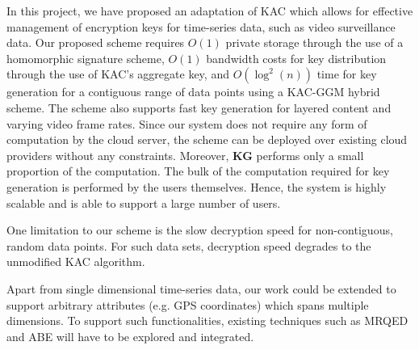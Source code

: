\documentclass[hyp,a4paper,12pt,openbib]{socreport}
\begin{document}
In this project, we have proposed an adaptation of KAC \cite{chu2013key} which allows for effective management of encryption keys for time-series data, such as video surveillance data. Our proposed scheme requires $O(1)$ private storage through the use of a homomorphic signature scheme, $O(1)$ bandwidth costs for key distribution through the use of KAC's aggregate key, and $O(\log^2(n))$ time for key generation for a contiguous range of data points using a KAC-GGM hybrid scheme. The scheme also supports fast key generation for layered content and varying video frame rates.  Since our system does not require any form of computation by the cloud server, the scheme can be deployed over existing cloud providers without any constraints. Moreover, \textbf{KG} performs only a small proportion of the computation. The bulk of the computation required for key generation is performed by the users themselves. Hence, the system is highly scalable and is able to support a large number of users.

One limitation to our scheme is the slow decryption speed for non-contiguous, random data points. For such data sets, decryption speed degrades to the unmodified KAC algorithm. 

Apart from single dimensional time-series data, our work could be extended to support arbitrary attributes (e.g. GPS coordinates) which spans multiple dimensions. To support such functionalities, existing techniques such as MRQED and ABE will have to be explored and integrated.






%
%
%
%
%
%
%
%
%
\end{document}
